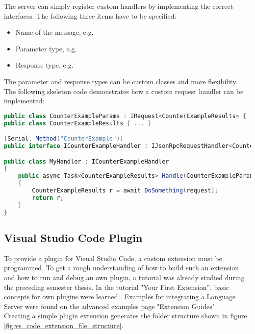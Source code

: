 The server can simply register custom handlers by implementing the correct interfaces.
The following three items have to be specified:
\begin{itemize}
    \item Name of the message, e.g. 
    \item Parameter type, e.g. 
    \item Response type, e.g. 
\end{itemize}


The parameter and response types can be custom classes and more flexibility.
The following skeleton code demonstrates how a custom request handler can be implemented:

\begin{lstlisting}[language=csharp, caption={LSP Handler Implementation for CounterExample}, captionpos=b, label={lst:lspcustomhandler}]
public class CounterExampleParams : IRequest<CounterExampleResults> { ... }
public class CounterExampleResults { ... }

[Serial, Method("CounterExample")]
public interface ICounterExampleHandler : IJsonRpcRequestHandler<CounterExampleParams, CounterExampleResults> { }

public class MyHandler : ICounterExampleHandler
{
    public async Task<CounterExampleResults> Handle(CounterExampleParams request, CancellationToken c)
    {
        CounterExampleResults r = await DoSomething(request);
        return r;
    }
}
\end{lstlisting}


\subsection{Visual Studio Code Plugin}
To provide a plugin for Visual Studio Code, a custom extension must be programmed.
To get a rough understanding of how to build such an extension
and how to run and debug an own plugin, a tutorial was already studied during the preceding semester thesis.
In the tutorial "Your First Extension”, basic concepts for own plugins were learned \cite{vscode-first-extension}.
Examples for integrating a Language Server were found on the advanced examples page "Extension Guides" \cite{vscode-extensions}. \\

Creating a simple plugin extension generates the folder structure shown in figure \ref{fig:vs_code_extension_file_structure}.

